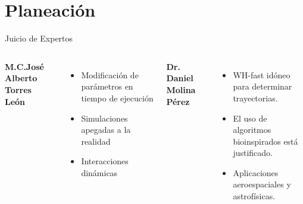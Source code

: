 \section{Planeación}

\begin{frame}{Juicio de Expertos}
  \begin{columns}[T]
    \textbf{M.C.José Alberto Torres León}
    \begin{itemize}
      \item Modificación de parámetros en tiempo de ejecución
      \item Simulaciones apegadas a la realidad
      \item Interacciones dinámicas
    \end{itemize}   
    \textbf{Dr. Daniel Molina Pérez}
       \begin{itemize}
         \item WH-fast idóneo para determinar trayectorias.
         \item El uso de algoritmos bioinspirados está justificado.
         \item Aplicaciones aeroespaciales y astrofísicas.
       \end{itemize}
   \end{columns}
 \end{frame}
  


  


